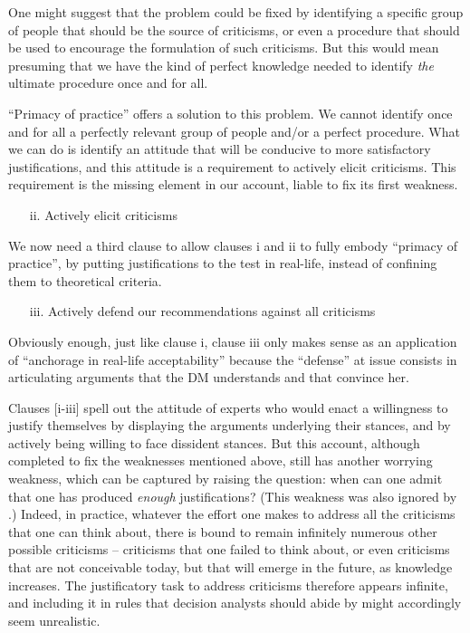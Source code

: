 \documentclass[preprint, french, english, 11pt, authoryear]{elsarticle}%
\begin{document}
One might suggest that the problem could be fixed by identifying a specific group of people that should be the source of criticisms, or even a procedure that should be used to encourage the formulation of such criticisms. But this would mean presuming that we have the kind of perfect knowledge needed to identify \emph{the} ultimate procedure once and for all.

``Primacy of practice” offers a solution to this problem. We cannot identify once and for all a perfectly relevant group of people and/or a perfect procedure. What we can do is identify an attitude that will be conducive to more satisfactory justifications, and this attitude is a requirement to actively elicit criticisms. This requirement is the missing element in our account, liable to fix its first weakness.

\begin{itemize}
\item[ii.]	Actively elicit criticisms
\end{itemize}

We now need a third clause to allow clauses i and ii to fully embody “primacy of practice”, by putting justifications to the test in real-life, instead of confining them to theoretical criteria.

\begin{itemize}
\item[iii.]	 Actively defend our recommendations against all criticisms
\end{itemize}

 Obviously enough, just like clause i, clause iii only makes sense as an application of ``anchorage in real-life acceptability'' because the ``defense'' at issue consists in articulating arguments that the \ac{DM} understands and that convince her.

Clauses [i-iii] spell out the attitude of experts who would enact a willingness to justify themselves by displaying the arguments underlying their stances, and by actively being willing to face dissident stances. But this account, although completed to fix the weaknesses mentioned above, still has another worrying weakness, which can be captured by raising the question: when can one admit that one has produced \emph{enough} justifications? (This weakness was also ignored by  \citet{meinard_what_2017}.) Indeed, in practice, whatever the effort one makes to address all the criticisms that one can think about, there is bound to remain infinitely numerous other possible criticisms -- criticisms that one failed to think about, or even criticisms that are not conceivable today, but that will emerge in the future, as knowledge increases. The justificatory task to address criticisms therefore appears infinite, and including it in rules that decision analysts should abide by might accordingly seem unrealistic.
\end{document}
